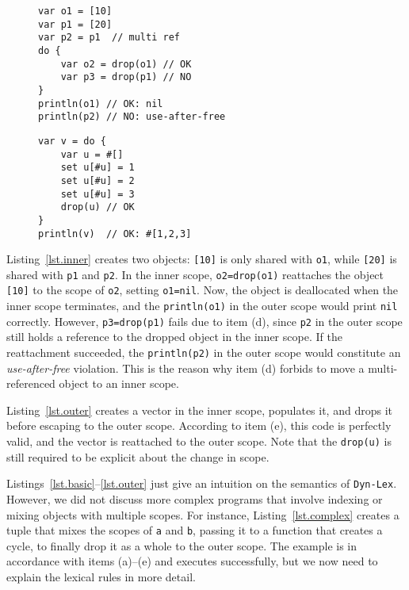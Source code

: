 \documentclass[12pt]{article}
\newcommand{\code}[1] {\texttt{\footnotesize{#1}}}
\newcommand{\lex} {\texttt{Dyn-Lex}\xspace}
\begin{document}
\begin{figure}
\begin{minipage}[t]{0.5\textwidth}
\begin{lstlisting}[caption=Move to inner scope., label=lst.inner]
var o1 = [10]
var p1 = [20]
var p2 = p1  // multi ref
do {
    var o2 = drop(o1) // OK
    var p3 = drop(p1) // NO
}
println(o1) // OK: nil
println(p2) // NO: use-after-free
\end{lstlisting}
\end{minipage}
\begin{minipage}[t]{0.5\textwidth}
\begin{lstlisting}[caption=Move to outer scope., label=lst.outer]
var v = do {
    var u = #[]
    set u[#u] = 1
    set u[#u] = 2
    set u[#u] = 3
    drop(u) // OK
}
println(v)  // OK: #[1,2,3]

\end{lstlisting}
\end{minipage}
\end{figure}

Listing~\ref{lst.inner} creates two objects: \code{[10]} is only shared with
\code{o1}, while \code{[20]} is shared with \code{p1} and \code{p2}.
%
In the inner scope, \code{o2=drop(o1)} reattaches the object \code{[10]} to the
scope of \code{o2}, setting \code{o1=nil}.
Now, the object is deallocated when the inner scope terminates, and the
\code{println(o1)} in the outer scope would print \code{nil} correctly.
%
However, \code{p3=drop(p1)} fails due to item (d), since \code{p2} in the outer
scope still holds a reference to the dropped object in the inner scope.
If the reattachment succeeded, the \code{println(p2)} in the outer scope would
constitute an \emph{use-after-free} violation.
%
This is the reason why item (d) forbids to move a multi-referenced object to an
inner scope.

Listing~\ref{lst.outer} creates a vector in the inner scope, populates it, and
drops it before escaping to the outer scope.
According to item (e), this code is perfectly valid, and the vector is
reattached to the outer scope.
Note that the \code{drop(u)} is still required to be explicit about the change
in scope.

Listings~\ref{lst.basic}--\ref{lst.outer} just give an intuition on the
semantics of \lex.
However, we did not discuss more complex programs that involve indexing or
mixing objects with multiple scopes.
For instance, Listing~\ref{lst.complex} creates a tuple that mixes the scopes
of \code{a} and \code{b}, passing it to a function that creates a cycle, to
finally drop it as a whole to the outer scope.
The example is in accordance with items (a)--(e) and executes successfully, but
we now need to explain the lexical rules in more detail.
\end{document}
